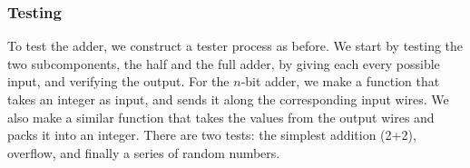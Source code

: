 \subsubsection*{Testing}
To test the adder, we construct a tester process as before. We start by testing
the two subcomponents, the half and the full adder, by giving each every
possible input, and verifying the output. For the
$n$-bit adder, we make a function that takes an integer as input, and sends it
along the corresponding input wires. We also make a similar function that
takes the values from the output wires and packs it into an integer. There are
two tests: the simplest addition (2+2), overflow, and finally a series of
random numbers.
